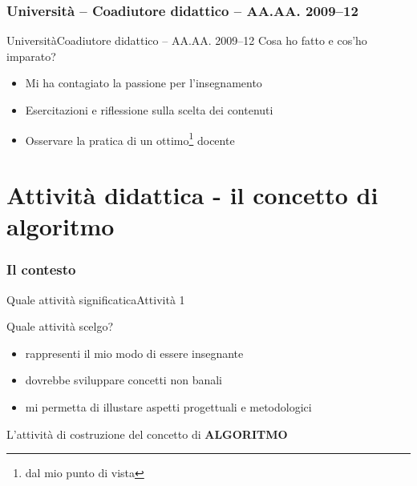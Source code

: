 \documentclass[italian]{beamer}
\begin{document}
\section{Universit\`a -- Coadiutore didattico -- AA.AA. 2009--12}

\begin{frame}{Universit\`a}{Coadiutore didattico -- AA.AA. 2009--12}
 Cosa ho fatto e cos'ho imparato?
 \begin{itemize}
  \item Mi ha contagiato la passione per l'insegnamento
  \item Esercitazioni e riflessione sulla scelta dei contenuti
  \item Osservare la pratica di un ottimo\footnote{dal mio punto di vista} docente
 \end{itemize}
 \note{}
\end{frame}

\part[Percorso didattico]{Attivit\`a didattica - il concetto di algoritmo}
\frame{\partpage}


\section[Contesto]{Il contesto}

\begin{frame}[allowframebreaks]{Quale attivit\`a significatica}{Attivit\`a 1}
	\begin{block}{Quale attivit\`a scelgo?}
		\begin{itemize}
			\item rappresenti il mio modo di essere insegnante
			\item dovrebbe sviluppare concetti non banali
			\item mi permetta di illustare aspetti progettuali
			 e metodologici
		\end{itemize}
	\end{block}

	\Large{L'attivit\`a di costruzione del concetto di {\bf ALGORITMO}}
\end{frame}
\end{document}
